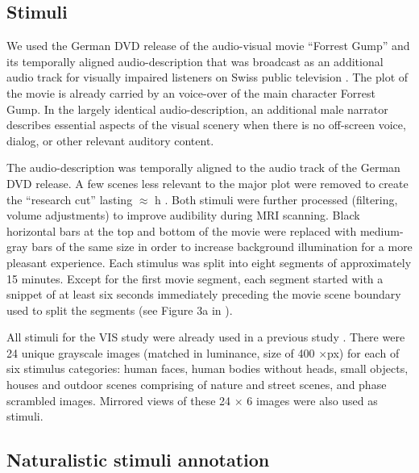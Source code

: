 \documentclass[english]{article}
\begin{document}
\subsection{Stimuli}
We used the German DVD release \citep{ForrestGumpDVD} of the audio-visual movie
``Forrest Gump'' \citep{ForrestGumpMovie} and its temporally aligned
audio-description that was broadcast as an additional audio track for visually
impaired listeners on Swiss public television \citep{ForrestGumpGermanAD}.
The plot of the movie is already carried by an voice-over of the main character
Forrest Gump.
In the largely identical audio-description, an additional male narrator
describes essential aspects of the visual scenery when there is no off-screen
voice, dialog, or other relevant auditory content.

The audio-description was temporally aligned to the audio track of the German
DVD release. A few scenes less relevant to the major plot were removed to create
the ``research cut'' lasting $\approx$ \unit[2]{h} \citep{hanke2014audiomovie,
hanke2016simultaneous}.
Both stimuli were further processed (filtering, volume adjustments) to improve
audibility during MRI scanning. Black horizontal bars at the top and bottom of
the movie were replaced with medium-gray bars of the same size in order to
increase background illumination for a more pleasant experience.
Each stimulus was split into eight segments of approximately 15 minutes. Except
for the first movie segment, each segment started with a snippet of at least six
seconds immediately preceding the movie scene boundary used to split the
segments (see Figure 3a in \citep{hanke2014audiomovie}).

All stimuli for the VIS study were already used in a previous study
\citep{haxby2011common}. There were 24 unique grayscale images (matched in
luminance, size of 400 $\times$\unit[400]{px}) for each of six stimulus
categories: human faces, human bodies without heads, small objects, houses and
outdoor scenes comprising of nature and street scenes, and phase scrambled
images. Mirrored views of these 24 $\times$ 6 images were also used as stimuli.


\subsection{Naturalistic stimuli annotation}
\end{document}
